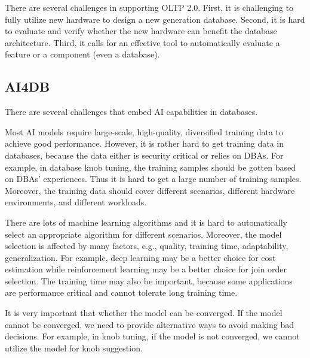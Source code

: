 There are several challenges in supporting OLTP 2.0. First, it is challenging to fully utilize new hardware to design a new generation database. Second, it is hard to evaluate and verify whether the new hardware can benefit the database architecture. Third, it calls for an effective tool to automatically evaluate a feature or a component (even a database). 








\subsection{AI4DB}

There are several challenges that embed AI capabilities in databases. 

 Most AI models require large-scale, high-quality, diversified training data to achieve good performance. However, it is rather hard to get training data in databases, because the data either is security critical or relies on DBAs. For example, in database knob tuning, the training samples should be gotten based on DBAs' experiences. Thus it is hard to get a large number of training samples. Moreover, the training data should cover different scenarios, different hardware environments, and different workloads.  


 There are lots of machine learning algorithms and it is hard to automatically select an appropriate algorithm for different scenarios. Moreover, the model selection is affected by many factors, e.g., quality, training time, adaptability, generalization. For example, deep learning may be a better choice for cost estimation while reinforcement learning may be a better choice for join order selection. The training time may also be important, because some applications are performance critical and cannot tolerate long training time. 


 It is very important that whether the model can be converged. If the model cannot be converged, we need to provide alternative ways to avoid making bad decisions. For example, in knob tuning, if the model is not converged, we cannot utilize the model for knob suggestion.   
 
